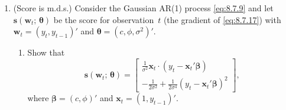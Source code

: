 \begin{enumerate}
\item (Score is m.d.s.)\quad
  Consider the Gaussian AR(1) process \eqref{eq:8.7.9} and let
  $\mathbf{s}(\mathbf{w}_t;\, \boldsymbol{\theta})$
  be the score for observation~$t$ (the gradient of \eqref{eq:8.7.17}) with
  $\mathbf{w}_t = (y_t, y_{t-1})'$
  and $\boldsymbol{\theta} = (c, \phi, \sigma^2)'$.

  \begin{enumerate}[label=(\alph*)]
  \item Show that
    \[
      \mathbf{s}(\mathbf{w}_t;\, \boldsymbol{\theta})
      = \begin{bmatrix}
          \frac{1}{\sigma^2}\mathbf{x}_t \cdot (y_t - \mathbf{x}_t'\boldsymbol{\beta}) \\[6pt]
          -\frac{1}{2\sigma^2} + \frac{1}{2\sigma^4}(y_t - \mathbf{x}_t'\boldsymbol{\beta})^2
        \end{bmatrix},
    \]
    where $\boldsymbol{\beta} = (c, \phi)'$ and $\mathbf{x}_t = (1, y_{t-1})'$.
  \end{enumerate}
\end{enumerate}
